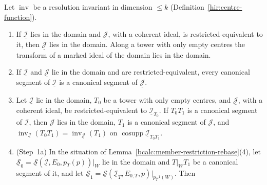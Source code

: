 \begin{lemma}
\label{bcalc:inv-rebase}
\mixedleanok
Let \(\operatorname{inv}\) be a resolution invariant in dimension \(\le k\) (Definition~\ref{hir:centre-function}).
\begin{enumerate}
\item If \(\underline{\mathcal I}\) lies in the domain and \(\underline{\mathcal J}\), with a coherent ideal, is restricted-equivalent to it, then \(\underline{\mathcal J}\) lies in the
domain. Along a tower with only empty centres the transform of a marked ideal of the domain lies in the domain.
\item If \(\underline{\mathcal I}\) and \(\underline{\mathcal J}\) lie in the domain and are restricted-equivalent, every canonical segment of \(\underline{\mathcal I}\) is a canonical segment of
\(\underline{\mathcal J}\).
\item Let \(\underline{\mathcal I}\) lie in the domain, \(T_0\) be a tower with only empty centres, and \(\underline{\mathcal J}\), with a coherent ideal, be restricted-equivalent to
\(\underline{\mathcal I}_{T_0}\). If \(T_0T_1\) is a canonical segment of \(\underline{\mathcal I}\), then \(\underline{\mathcal J}\) lies in the domain, \(T_1\) is a canonical segment of
\(\underline{\mathcal J}\), and \(\operatorname{inv}_{\underline{\mathcal I}}(T_0T_1)=\operatorname{inv}_{\underline{\mathcal J}}(T_1)\) on \(\operatorname{cosupp}\underline{\mathcal I}_{T_0T_1}\).
\item (Step~1a) In the situation of Lemma~\ref{bcalc:member-restriction-rebase}(4), let \(\underline{\mathcal S}_0=\underline{\mathcal S}(\underline{\mathcal I},E_0,p_T(p))|_W\) lie in the
domain and \(T|_WT_1\) be a canonical segment of it, and let \(\underline{\mathcal S}_1=\underline{\mathcal S}(\underline{\mathcal I}_T,E_{0,T},p)|_{p_T^{-1}(W)}\). Then

\end{enumerate}
\end{lemma}

